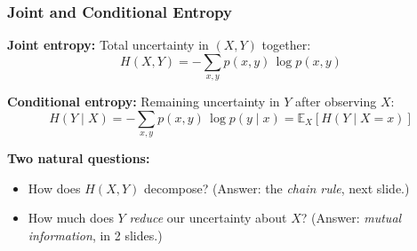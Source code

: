 \documentclass[aspectratio=169]{beamer}
\begin{document}
\begin{frame}
\frametitle{Joint and Conditional Entropy}

\small
\textbf{Joint entropy:} Total uncertainty in $(X, Y)$ together:
$$H(X, Y) = -\sum_{x,y} p(x,y)\,\log p(x,y)$$

\textbf{Conditional entropy:} Remaining uncertainty in $Y$ after observing $X$:
$$H(Y \mid X) = -\sum_{x,y} p(x,y)\,\log p(y \mid x) = \mathbb{E}_X\!\left[H(Y \mid X{=}x)\right]$$

\vspace{0.15cm}
\textbf{Two natural questions:}
\begin{itemize}\setlength{\itemsep}{3pt}
  \item How does $H(X,Y)$ decompose? \;\;(Answer: the \emph{chain rule}, next slide.)
  \item How much does $Y$ \emph{reduce} our uncertainty about $X$? \;\;(Answer: \emph{mutual information}, in 2 slides.)
\end{itemize}

\vspace{0.15cm}
\begin{center}
\end{center}
\end{frame}
\end{document}
